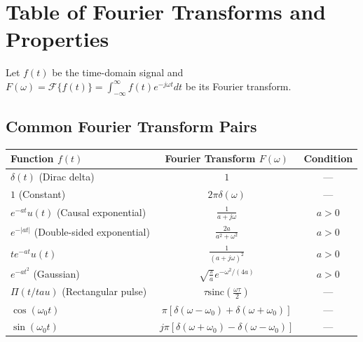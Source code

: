 \documentclass{article}
\begin{document}
\section*{Table of Fourier Transforms and Properties}
Let $f(t)$ be the time-domain signal and $F(\omega) = \mathcal{F}\{f(t)\} = \int_{-\infty}^{\infty} f(t) e^{-j\omega t} dt$ be its Fourier transform.

\subsection*{Common Fourier Transform Pairs}
\begin{center}
\begin{tabular}{|l|c|c|}
\hline
\textbf{Function} $f(t)$ & \textbf{Fourier Transform} $F(\omega)$ & \textbf{Condition} \\ \hline
$\delta(t)$ (Dirac delta) & $1$ & --- \\ \hline
$1$ (Constant) & $2\pi\delta(\omega)$ & --- \\ \hline
$e^{-at} u(t)$ (Causal exponential) & $\frac{1}{a + j\omega}$ & $a > 0$ \\ \hline
$e^{-|at|}$ (Double-sided exponential) & $\frac{2a}{a^2 + \omega^2}$ & $a > 0$ \\ \hline
$t e^{-at} u(t)$ & $\frac{1}{(a + j\omega)^2}$ & $a > 0$ \\ \hline
$e^{-at^2}$ (Gaussian) & $\sqrt{\frac{\pi}{a}} e^{-\omega^2 / (4a)}$ & $a > 0$ \\ \hline
$\Pi(t/tau)$ (Rectangular pulse) & $\tau \text{sinc}\left(\frac{\omega\tau}{2}\right)$ & --- \\ \hline
$\cos(\omega_0 t)$ & $\pi [\delta(\omega - \omega_0) + \delta(\omega + \omega_0)]$ & --- \\ \hline
$\sin(\omega_0 t)$ & $j\pi [\delta(\omega + \omega_0) - \delta(\omega - \omega_0)]$ & --- \\ \hline
\end{tabular}
\end{center}
\end{document}
